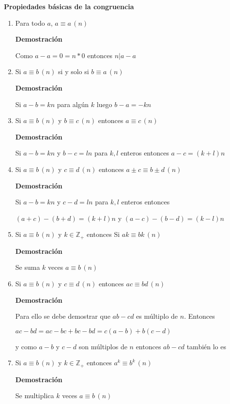 \documentclass[a4paper,12pt]{report}
\begin{document}
\textbf{Propiedades básicas de la congruencia}
\begin{enumerate}
 \item Para todo $a$, $a \equiv a \, (n)$
 
 \textbf{Demostración}
 
 Como $a-a = 0 = n*0$ entonces $n|a-a$
 
 \item Si $a \equiv b \, (n)$ si y solo si $b \equiv a \, (n)$
 
 \textbf{Demostración}
 
 Si $a-b=kn$ para algún $k$ luego $b-a=-kn$
 
 \item Si $a \equiv b \, (n)$ y $b \equiv c \, (n)$ entonces $a \equiv c \, (n)$
 
 \textbf{Demostración}
 
 Si $a-b=kn$ y $b-c=ln$ para $k,l$ enteros entonces $a-c=(k+l)n$
 
 \item Si $a \equiv b \, (n)$ y $c \equiv d \, (n)$ entonces $a\pm c \equiv b\pm d \, (n)$
 
 \textbf{Demostración}
 
 Si $a-b=kn$ y $c-d=ln$ para $k,l$ enteros entonces 
 
 $(a+c)-(b+d)=(k+l)n$ y $(a-c)-(b-d)=(k-l)n$
 
 \item Si $a \equiv b \, (n)$ y $k\in\mathbb{Z}_+$ entonces Si $ak \equiv bk \, (n)$
 
 \textbf{Demostración}
 
 Se suma $k$ veces $a \equiv b \, (n)$
 
 \item Si $a \equiv b \, (n)$ y $c \equiv d \, (n)$ entonces $ac \equiv bd \, (n)$
 
 \textbf{Demostración}
 
 Para ello se debe demostrar que $ab - cd$ es múltiplo de $n$. Entonces 
 
 $ac - bd = ac - bc + bc - bd = c(a-b) + b(c-d)$
 
 y como $a-b$ y $c-d$ son múltiplos de $n$ entonces $ab - cd$ también lo es
 
 
 \item Si $a \equiv b \, (n)$ y $k\in\mathbb{Z}_+$ entonces $a^k \equiv b^k \, (n)$
 
  \textbf{Demostración}
 
 Se multiplica $k$ veces $a \equiv b \, (n)$
 

\end{enumerate}
\end{document}
